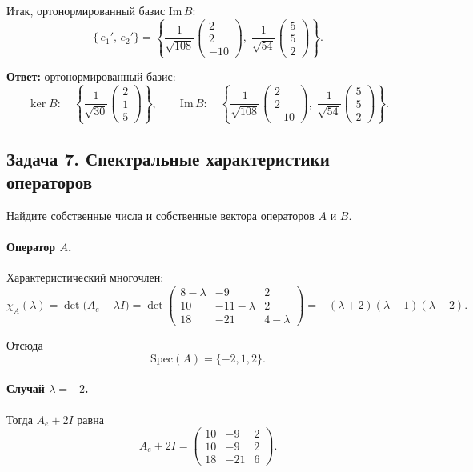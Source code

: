 \documentclass[12pt]{article}
\begin{document}
Итак, ортонормированный базис \(\mathrm{Im}\,B\):
\[
	\bigl\{\,e_1',\,e_2'\bigr\}
	= \left\{
	\frac{1}{\sqrt{108}}
	\begin{pmatrix}2\\2\\-10\end{pmatrix},
	\;
	\frac{1}{\sqrt{54}}
	\begin{pmatrix}5\\5\\2\end{pmatrix}
	\right\}.
\]

\textbf{Ответ:} ортонормированный базис:
\[
	\ker B:\quad \left\{\frac{1}{\sqrt{30}}
	\begin{pmatrix}2\\1\\5\end{pmatrix}\right\},
	\qquad
	\mathrm{Im}\,B:\quad
	\left\{\frac{1}{\sqrt{108}}
	\begin{pmatrix}2\\2\\-10\end{pmatrix},\;
	\frac{1}{\sqrt{54}}
	\begin{pmatrix}5\\5\\2\end{pmatrix}\right\}.
\]

\subsection*{Задача 7. Спектральные характеристики операторов}
Найдите собственные числа и собственные вектора операторов \(A\) и \(B\).

\paragraph*{Оператор \(A\).}
Характеристический многочлен:
\[
	\chi_A(\lambda)
	=\det\bigl(A_e-\lambda I\bigr)
	=\det
	\begin{pmatrix}
		8-\lambda & -9          & 2         \\
		10        & -11-\lambda & 2         \\
		18        & -21         & 4-\lambda
	\end{pmatrix}
	= -(\lambda+2)(\lambda-1)(\lambda-2).
\]

Отсюда
\[
	\mathrm{Spec}(A)=\{-2,1,2\}.
\]

\paragraph*{Случай \(\lambda=-2\).}
Тогда \(A_e+2I\) равна
\[
	A_e+2I=
	\begin{pmatrix}
		10 & -9  & 2 \\
		10 & -9  & 2 \\
		18 & -21 & 6
	\end{pmatrix}.
\]
\end{document}

